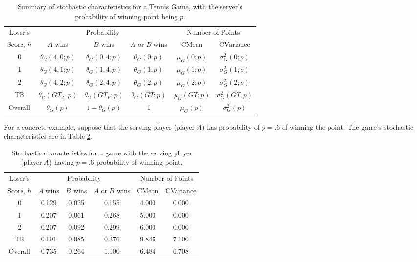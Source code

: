\documentclass[11pt]{article}
\theoremstyle{plain}
\theoremstyle{definition}
\begin{document}
\begin{table}[h]
\begin{center}
\begin{tabular}{||c||c|c||c||c|c||}\hline\hline
Loser's & \multicolumn{3}{c||}{Probability} & \multicolumn{2}{c||}{Number of Points} \\
 \cline{2-4} \cline{5-6}
Score, $h$ & $A$ wins & $B$ wins & $A$ or $B$ wins & CMean & CVariance \\ \hline\hline
0 & $\theta_G(4,0;p)$ & $\theta_G(0,4;p)$ & $\theta_G(0;p)$ & $\mu_G(0;p)$ & $\sigma_G^2(0;p)$ \\
1 & $\theta_G(4,1;p)$ & $\theta_G(1,4;p)$ & $\theta_G(1;p)$ & $\mu_G(1;p)$ & $\sigma_G^2(1;p)$ \\
2 & $\theta_G(4,2;p)$ & $\theta_G(2,4;p)$ & $\theta_G(2;p)$ & $\mu_G(2;p)$ & $\sigma_G^2(2;p)$ \\ \hline
TB & $\theta_{G}(GT_A;p)$ & $\theta_{G}(GT_B;p)$ & $\theta_G(GT;p)$ & $\mu_G(GT;p)$ & $\sigma_G^2(GT;p)$ \\ \hline\hline
Overall & $\theta_G(p)$ & $1-\theta_G(p)$ & 1 & $\mu_G(p)$ & $\sigma_G^2(p)$ \\ \hline\hline
\end{tabular}
\caption{Summary of stochastic characteristics for a Tennis Game, with the server's probability of winning point being $p$.}
\label{tab: game suimmary}
\end{center}
\end{table}

For a concrete example, suppose that the serving player (player $A$) has probability of $p=.6$ of winning the point. The game's stochastic characteristics are in Table \ref{tab: game stats p=.6}.

\begin{table}[h]
\begin{center}
\begin{tabular}{||c||c|c||c||c|c||}\hline\hline
Loser's & \multicolumn{3}{c||}{Probability} & \multicolumn{2}{c||}{Number of Points} \\ \cline{2-4} \cline{5-6}
Score, $h$ & $A$ wins & $B$ wins & $A$ or $B$ wins & CMean & CVariance \\ \hline\hline
       0 & 0.129 & 0.025 & 0.155 & 4.000 & 0.000 \\
       1 & 0.207 & 0.061 & 0.268 & 5.000 & 0.000 \\
       2 & 0.207 & 0.092 & 0.299 & 6.000 &  0.000 \\ \hline
      TB & 0.191 & 0.085 & 0.276 & 9.846  & 7.100 \\ \hline\hline
 Overall & 0.735 & 0.264 & 1.000 & 6.484 &  6.708 \\ \hline\hline
 \end{tabular}
 \caption{Stochastic characteristics for a game with the serving player (player $A$) having $p=.6$ probability of winning point.}
\label{tab: game stats p=.6}
 \end{center}
 \end{table}
\end{document}
